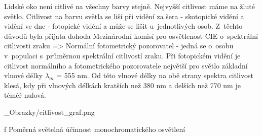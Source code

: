 Lidské oko není citlivé na všechny barvy stejně. Nejvyšší citlivost máme na žluté světlo. Citlivost na barvu
světla se liší při vidění za šera - skotopické vidění a vidění ve dne - fotopické vidění a může se lišit
u~jednotlivých osob.
Z~těchto důvodů byla přijata dohoda Mezinárodní komisí pro osvětlenost CIE o~spektrální
citlivosti zraku => {\sbf Normální fotometrický pozorovatel} - jedná se o~osobu v~populaci s~průměrnou
spektrální citlivostí zraku. Při fotopickém vidění je citlivost normálního a fotometrického pozorovatele
největší pro světlo základní vlnové délky $λ_m$ = 555 nm. Od této vlnové délky na obě strany spektra
citlivost klesá, kdy při vlnových délkách kratších než 380 nm a delších než 770 nm je téměř nulová.

\medskip

\medskip {}
\picw=12cm _Obrazky/citlivost_graf.png
\caption/f Poměrná světelná účinnost monochromatického osvětlení


